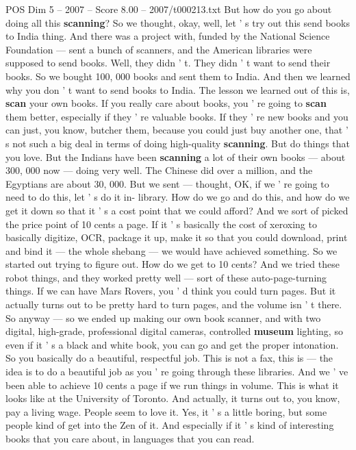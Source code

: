 \begin{textsample}{POS Dim 5 – 2007 – Score 8.00 – 2007/t000213.txt}
But how do you go about doing all this \textbf{scanning}?
So we thought, okay, well, let ' s try out this send books to India thing.
And there was a project with, funded by the National Science Foundation — sent a bunch of scanners, and the American libraries were supposed to send books.
Well, they didn ' t.
They didn ' t want to send their books.
So we bought 100, 000 books and sent them to India.
And then we learned why you don ' t want to send books to India.
The lesson we learned out of this is, \textbf{scan} your own books.
If you really care about books, you ' re going to \textbf{scan} them better, especially if they ' re valuable books.
If they ' re new books and you can just, you know, butcher them, because you could just buy another one, that ' s not such a big deal in terms of doing high-quality \textbf{scanning}.
But do things that you love.
But the Indians have been \textbf{scanning} a lot of their own books — about 300, 000 now — doing very well.
The Chinese did over a million, and the Egyptians are about 30, 000.
But we sent — thought, OK, if we ' re going to need to do this, let ' s do it in- library.
How do we go and do this, and how do we get it down so that it ' s a cost point that we could afford?
And we sort of picked the price point of 10 cents a page.
If it ' s basically the cost of xeroxing to basically digitize, OCR, package it up, make it so that you could download, print and bind it — the whole shebang — we would have achieved something.
So we started out trying to figure out.
How do we get to 10 cents?
And we tried these robot things, and they worked pretty well — sort of these auto-page-turning things.
If we can have Mars Rovers, you ' d think you could turn pages.
But it actually turns out to be pretty hard to turn pages, and the volume isn ' t there.
So anyway — so we ended up making our own book scanner, and with two digital, high-grade, professional digital cameras, controlled \textbf{museum} lighting, so even if it ' s a black and white book, you can go and get the proper intonation.
So you basically do a beautiful, respectful job.
This is not a fax, this is — the idea is to do a beautiful job as you ' re going through these libraries.
And we ' ve been able to achieve 10 cents a page if we run things in volume.
This is what it looks like at the University of Toronto.
And actually, it turns out to, you know, pay a living wage.
People seem to love it.
Yes, it ' s a little boring, but some people kind of get into the Zen of it.
And especially if it ' s kind of interesting books that you care about, in languages that you can read.

\end{textsample}
